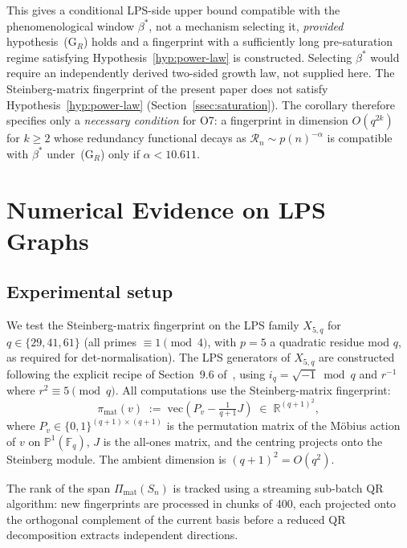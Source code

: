 \documentclass[11pt]{article}
\theoremstyle{definition}
\theoremstyle{remark}
\newcommand{\R}{\mathbb{R}}
\newcommand{\F}{\mathbb{F}}
\newcommand{\Rn}{\mathcal{R}_n}
\begin{document}
    This gives a conditional LPS-side upper bound compatible with the phenomenological window
    $\beta^*$, not a mechanism selecting it, \emph{provided} hypothesis~(G$_R$) holds and a fingerprint
    with a sufficiently long pre-saturation regime satisfying Hypothesis~\ref{hyp:power-law} is
    constructed.
    Selecting $\beta^*$ would require an independently derived two-sided growth law, not supplied here.
    The Steinberg-matrix fingerprint of the present paper does not satisfy Hypothesis~\ref{hyp:power-law}
    (Section~\ref{ssec:saturation}).
    The corollary therefore specifies only a \emph{necessary condition} for O7: a fingerprint
    in dimension $O(q^{2k})$ for $k \geq 2$ whose redundancy functional decays as
    $\Rn \sim p(n)^{-\alpha}$ is compatible with $\beta^*$ under~(G$_R$) only if $\alpha < 10.611$.

  \section{Numerical Evidence on LPS Graphs}
  \label{sec:numerics}

  \subsection{Experimental setup}
    \label{ssec:setup}

    We test the Steinberg-matrix fingerprint on the LPS family $X_{5,q}$ for
    $q \in \{29, 41, 61\}$ (all primes $\equiv 1 \pmod 4$, with $p=5$ a quadratic
    residue mod $q$, as required for det-normalisation).
    The LPS generators of $X_{5,q}$ are constructed following the explicit recipe of
    Section~9.6 of~\cite{Beau2026a1}, using $i_q = \sqrt{-1} \bmod q$
    and $r^{-1}$ where $r^2 \equiv 5 \pmod{q}$.
    All computations use the Steinberg-matrix fingerprint:
    \begin{equation}
      \label{eq:fp-steinberg-mat}
      \pi_{\mathrm{mat}}(v) \;:=\; \mathrm{vec}\!\left( P_v - \tfrac{1}{q+1} J \right)
      \;\in\; \R^{(q+1)^2},
    \end{equation}
    where $P_v \in \{0,1\}^{(q+1)\times(q+1)}$ is the permutation matrix of the
    M\"{o}bius action of $v$ on $\mathbb{P}^1(\F_q)$, $J$ is the all-ones matrix,
    and the centring projects onto the Steinberg module.
    The ambient dimension is $(q+1)^2 = O(q^2)$.

    The rank of the span $\Pi_{\mathrm{mat}}(S_n)$ is tracked using a streaming
    sub-batch QR algorithm: new fingerprints are processed in chunks of 400,
    each projected onto the orthogonal complement of the current basis before
    a reduced QR decomposition extracts independent directions.
\end{document}
